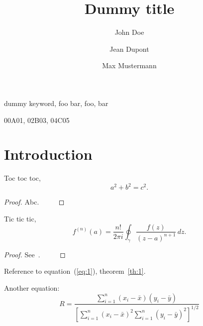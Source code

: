 \documentclass[draft,reqno]{etna}
\title{Dummy title}
\author{John Doe\footnotemark[1]
\and
Jean Dupont\footnotemark[1]
\and
Max Mustermann\footnotemark[2]
}
\begin{document}
\maketitle



\begin{abstract}
  \lipsum[1]
\end{abstract}

\begin{keywords}
   dummy keyword, foo bar, foo, bar
\end{keywords}

\begin{AMS}
  00A01, 02B03, 04C05
\end{AMS}

\section{Introduction}
\lipsum[2]

\begin{theorem}[Pythagoras]
Toc toc toc,
\begin{equation}
a^2 + b^2 = c^2.
\end{equation}
\end{theorem}
\begin{proof}
  Abc. $\qquad$
\end{proof}

\lipsum[3]

\begin{theorem}[Cauchy]\label{th:1}
  Tic tic tic,
  \begin{equation}\label{eq:1}
    f^{(n)}(a) = \frac{n!}{2\pi i} \oint_\gamma \frac{f(z)}{(z-a)^{n+1}}\, dz.
  \end{equation}
\end{theorem}
\begin{proof}
See~\cite{cauchy1821cours}. $\qquad$
\end{proof}

Reference to equation~(\ref{eq:1}), theorem~\ref{th:1}.

Another equation:
\begin{equation}
  R = \frac{\displaystyle{\sum_{i=1}^n (x_i-\bar{x})(y_i-
\bar{y})}}{\displaystyle{\left[
\sum_{i=1}^n(x_i-\bar{x})^2
\sum_{i=1}^n(y_i-\bar{y})^2\right]^{1/2}}}
\end{equation}
\end{document}
